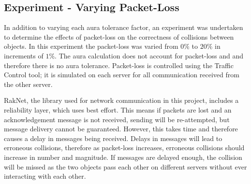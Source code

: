 





\subsection{Experiment - Varying Packet-Loss}

In addition to varying each aura tolerance factor, an experiment was undertaken to determine the effects of packet-loss on the correctness of collisions between objects. In this experiment the packet-loss was varied from $0\%$ to $20\%$ in increments of $1\%$. The aura calculation does not account for packet-loss and and therefore there is no aura tolerance. Packet-loss is controlled using the Traffic Control tool; it is simulated on each server for all communication received from the other server.

RakNet, the library used for network communication in this project, includes a reliability layer, which uses best effort. This means if packets are lost and an acknowledgement message is not received, sending will be re-attempted, but message delivery cannot be guaranteed. However, this takes time and therefore causes a delay in messages being received. Delays in messages will lead to erroneous collisions, therefore as packet-loss increases, erroneous collisions should increase in number and magnitude. If messages are delayed enough, the collision will be missed as the two objects pass each other on different servers without ever interacting with each other. 

